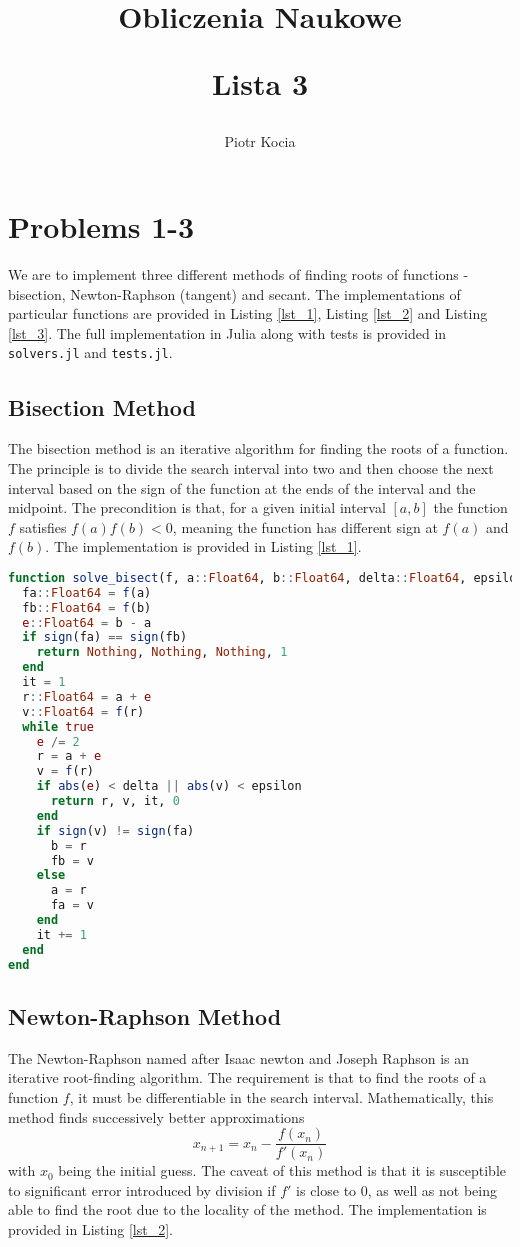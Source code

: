 \documentclass[12pt, a4paper]{article}
\title{
  Obliczenia Naukowe\\
  \begin{center}\Large Lista 3\end{center}
}
\author{Piotr Kocia}
\newcommand{\code}[1]{\texttt{#1}}
\begin{document}
\maketitle

\tableofcontents

\section{Problems 1-3}
We are to implement three different methods of finding roots of functions -
bisection, Newton-Raphson (tangent) and secant. The implementations of
particular functions are provided in Listing \ref{lst_1}, Listing \ref{lst_2}
and Listing \ref{lst_3}. The full implementation in Julia along with tests is
provided in \code{solvers.jl} and \code{tests.jl}.

\subsection{Bisection Method}
The bisection method is an iterative algorithm for finding the roots of a
function. The principle is to divide the search interval into two and then
choose the next interval based on the sign of the function at the ends of the
interval and the midpoint. The precondition is that, for a given initial
interval $[a ,b]$ the function $f$ satisfies $f(a)f(b) < 0$, meaning the
function has different sign at $f(a)$ and $f(b)$. The implementation is provided
in Listing \ref{lst_1}.

\begin{lstlisting}[language=Julia, caption=Implementation of the bisection method., label = lst_1]
function solve_bisect(f, a::Float64, b::Float64, delta::Float64, epsilon::Float64)
  fa::Float64 = f(a)
  fb::Float64 = f(b)
  e::Float64 = b - a
  if sign(fa) == sign(fb)
    return Nothing, Nothing, Nothing, 1
  end
  it = 1
  r::Float64 = a + e
  v::Float64 = f(r)
  while true
    e /= 2
    r = a + e
    v = f(r)
    if abs(e) < delta || abs(v) < epsilon
      return r, v, it, 0
    end
    if sign(v) != sign(fa)
      b = r
      fb = v
    else
      a = r
      fa = v
    end
    it += 1
  end
end
\end{lstlisting}

\subsection{Newton-Raphson Method}
The Newton-Raphson named after Isaac newton and Joseph Raphson is an iterative
root-finding algorithm. The requirement is that to find the roots of a function
$f$, it must be differentiable in the search interval. Mathematically, this method finds successively better approximations
$$
x_{n+1} = x_n - \frac{f(x_n)}{f'(x_n)}
$$
with $x_0$ being the initial guess. The caveat of this method is that it is
susceptible to significant error introduced by division if $f'$ is close to 0,
as well as not being able to find the root due to the locality of the method.
The implementation is provided in Listing \ref{lst_2}.
\end{document}
